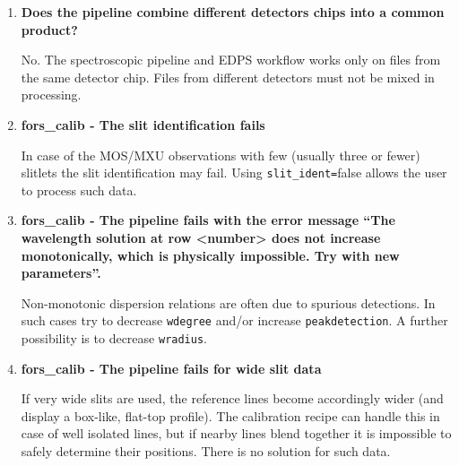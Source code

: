 \begin{enumerate}
\begin{itemize}
\end{itemize}

With respect to the faction of flux contained within the slit one should keep in mind that the flux standard stars are observed with a 5” wide slit, while science data are typically observed with slit widths of 0.8” to 1”. For a point source a slit width of 0.8”/1.0” used with a seeing of 0.8” means that some 33\%/24\%,
respectively, of the target flux are lost (see also Fig. 17). This results in a too low flux for the flux calibrated spectrum of the target.
If the standard star or the target or both are observed under non-photometric conditions (e.g. CLR or THN) their observed flux will be lower than it should be. If the standard star is observed under photometric conditions but the science target is not the flux in the flux calibrated target spectrum will be too low.
The opposite happens if the target is observed under photometric conditions but the standard star is not. CLR/THN conditions allow for transparency variations of 10\%/20\%, respectively.


\item {\bf Does the pipeline combine different detectors chips into a common product?}

No. The spectroscopic pipeline and EDPS workflow works only on files from the same detector chip. Files from different detectors must not be mixed in processing.


\item {\bf fors\_calib - The slit identification fails}

In case of the MOS/MXU observations with few (usually three or fewer) slitlets the slit identification may fail. Using {\tt slit\_ident=}false allows the user to process such data.

\item {\bf fors\_calib - The pipeline fails with the error message “The wavelength solution at row <number> does not increase monotonically, which is physically impossible. Try with new parameters”.}

Non-monotonic dispersion relations are often due to spurious detections. In such cases try to decrease {\tt wdegree} and/or increase {\tt peakdetection}. A further possibility is to decrease {\tt wradius}.

\item {\bf fors\_calib  - The pipeline fails for wide slit data}

If very wide slits are used, the reference lines become accordingly wider (and display a box-like, flat-top profile). The calibration recipe can handle this in case of well isolated lines, but if nearby lines blend together it is impossible to safely determine their positions. There is no solution for such data.


\end{enumerate}
